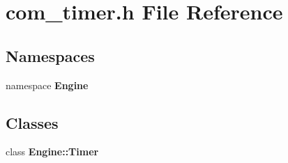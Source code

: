 \section{com\_\-timer.h File Reference}
\label{com__timer_8h}
\subsection*{Namespaces}
\begin{CompactItemize}
\item 
namespace {\bf Engine}
\end{CompactItemize}
\subsection*{Classes}
\begin{CompactItemize}
\item 
class {\bf Engine::Timer}
\end{CompactItemize}
